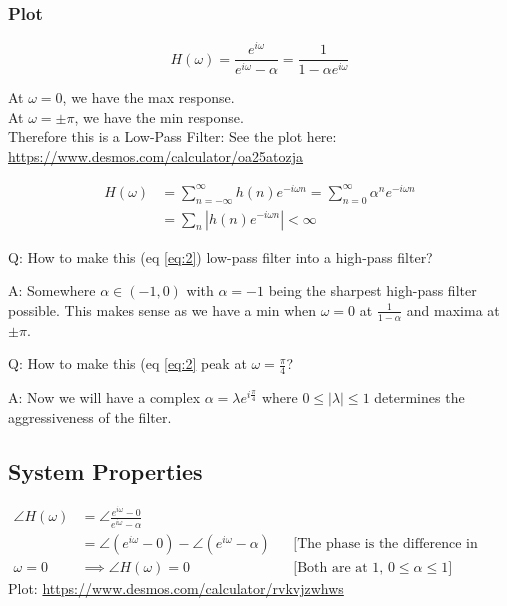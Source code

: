 \subsubsection{Plot}
\begin{equation}\label{eq:2}
    H(\omega) 
    = \frac{e^{i\omega}}{e^{i\omega}-\alpha}
    = \frac1{1-\alpha e^{i\omega}}
\end{equation}

At $\omega = 0$, we have the max response.\\
At $\omega = \pm\pi$, we have the min response.\\
Therefore this is a Low-Pass Filter:
See the plot here:\\
\href{https://www.desmos.com/calculator/oa25atozja}{https://www.desmos.com/calculator/oa25atozja}

\begin{align*}
    H(\omega) 
    &= \sum_{n=-\infty}^\infty h(n) e^{-i\omega n}
    = \sum_{n=0}^\infty \alpha^n e^{-i\omega n}
    \\
    &= \sum_n |h(n) e^{-i\omega n}| < \infty
\end{align*}

\begin{shaded}
Q: How to make this (eq \eqref{eq:2}) low-pass filter into a high-pass filter?

A: Somewhere $\alpha\in(-1, 0)$ with $\alpha=-1$ being the sharpest high-pass filter possible. This makes sense as we have a min when $\omega=0$ at $\frac1{1-\alpha}$ and maxima at $\pm\pi$.
\end{shaded}

\begin{shaded}
Q: How to make this (eq \eqref{eq:2} peak at $\omega=\frac\pi4$?

A: Now we will have a complex $\alpha=\lambda e^{i\frac\pi4}$ where $0\le|\lambda|\le1$ determines the aggressiveness of the filter.
\end{shaded}

\subsection{System Properties}
\begin{align*}
    \angle H(\omega) 
    &= \angle \frac{e^{i\omega} - 0}{e^{i\omega}-\alpha}
    \\
    &= \angle{(e^{i\omega} - 0)} - \angle{(e^{i\omega}-\alpha)}
    &&\text{[The phase is the difference in phases of the 2 vectors]}
    \\
    \omega=0
    &\implies\angle H(\omega) = 0
    &&\text{[Both are at 1, }0\le\alpha\le1]
\end{align*}
Plot: \href{https://www.desmos.com/calculator/rvkvjzwhws}{https://www.desmos.com/calculator/rvkvjzwhws}

